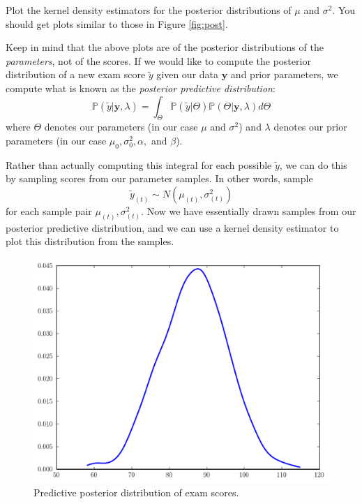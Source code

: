 \begin{problem}
Plot the kernel density estimators for the posterior distributions of $\mu$ and $\sigma^{2}$.
You should get plots similar to those in Figure \ref{fig:post}.
\end{problem}

Keep in mind that the above plots are of the posterior distributions of the \emph{parameters}, not of the scores. If we would like to compute the posterior distribution of a new exam score $\tilde{y}$ given our data $\mathbf{y}$ and prior parameters, we compute what is known as the \emph{posterior predictive distribution}:
\begin{equation*}
\mathbb{P}(\tilde{y} | \mathbf{y}, \lambda) = \int_{\Theta} \mathbb{P}(\tilde{y} | \Theta)\mathbb{P}(\Theta | \mathbf{y}, \lambda) d\Theta
\end{equation*}
where $\Theta$ denotes our parameters (in our case $\mu$ and $\sigma^{2}$) and $\lambda$ denotes our prior parameters (in our case $\mu_{0}, \sigma_{0}^{2}, \alpha,$ and $\beta$).

Rather than actually computing this integral for each possible $\tilde{y}$, we can do this by sampling scores from our parameter samples. In other words, sample
\begin{equation*}
\tilde{y}_{(t)} \sim N(\mu_{(t)}, \sigma_{(t)}^{2})
\end{equation*}
for each sample pair $\mu_{(t)}, \sigma_{(t)}^{2}$. Now we have essentially drawn samples from our posterior predictive distribution, and we can use a kernel density estimator to plot this distribution from the samples.

\begin{figure}
\includegraphics[width=\textwidth]{predictiveposterior.pdf}
\caption{Predictive posterior distribution of exam scores.}
\label{fig:predictive}
\end{figure}

